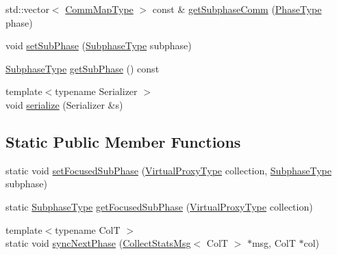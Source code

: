 \begin{DoxyCompactItemize}
\item 
std\+::vector$<$ \hyperlink{namespacevt_1_1vrt_1_1collection_1_1balance_a10860c956804d644db54a16012352728}{Comm\+Map\+Type} $>$ const  \& \hyperlink{structvt_1_1vrt_1_1collection_1_1balance_1_1_element_stats_a12d4f7166391b0e4283a287fde9d8202}{get\+Subphase\+Comm} (\hyperlink{namespacevt_a46ce6733d5cdbd735d561b7b4029f6d7}{Phase\+Type} phase)
\item 
void \hyperlink{structvt_1_1vrt_1_1collection_1_1balance_1_1_element_stats_a6f24460421195baa579f9a0dc7f6569c}{set\+Sub\+Phase} (\hyperlink{namespacevt_ae78cbfdf1e57470e33eedb074f2beeba}{Subphase\+Type} subphase)
\item 
\hyperlink{namespacevt_ae78cbfdf1e57470e33eedb074f2beeba}{Subphase\+Type} \hyperlink{structvt_1_1vrt_1_1collection_1_1balance_1_1_element_stats_aa6876c8014bf0b9c9bf0061ed70ad721}{get\+Sub\+Phase} () const
\item 
{\footnotesize template$<$typename Serializer $>$ }\\void \hyperlink{structvt_1_1vrt_1_1collection_1_1balance_1_1_element_stats_a2a329a760a794097651a78157cf12452}{serialize} (Serializer \&s)
\end{DoxyCompactItemize}
\subsection*{Static Public Member Functions}
\begin{DoxyCompactItemize}
\item 
static void \hyperlink{structvt_1_1vrt_1_1collection_1_1balance_1_1_element_stats_a783aba29f79b50652c78ca148b766578}{set\+Focused\+Sub\+Phase} (\hyperlink{namespacevt_a1b417dd5d684f045bb58a0ede70045ac}{Virtual\+Proxy\+Type} collection, \hyperlink{namespacevt_ae78cbfdf1e57470e33eedb074f2beeba}{Subphase\+Type} subphase)
\item 
static \hyperlink{namespacevt_ae78cbfdf1e57470e33eedb074f2beeba}{Subphase\+Type} \hyperlink{structvt_1_1vrt_1_1collection_1_1balance_1_1_element_stats_ac52b9e7f8ba66cc20e8130fa1e037e07}{get\+Focused\+Sub\+Phase} (\hyperlink{namespacevt_a1b417dd5d684f045bb58a0ede70045ac}{Virtual\+Proxy\+Type} collection)
\item 
{\footnotesize template$<$typename ColT $>$ }\\static void \hyperlink{structvt_1_1vrt_1_1collection_1_1balance_1_1_element_stats_ae9425ce57397a368d58db9883b996939}{sync\+Next\+Phase} (\hyperlink{structvt_1_1vrt_1_1collection_1_1balance_1_1_collect_stats_msg}{Collect\+Stats\+Msg}$<$ ColT $>$ $\ast$msg, ColT $\ast$col)
\end{DoxyCompactItemize}
